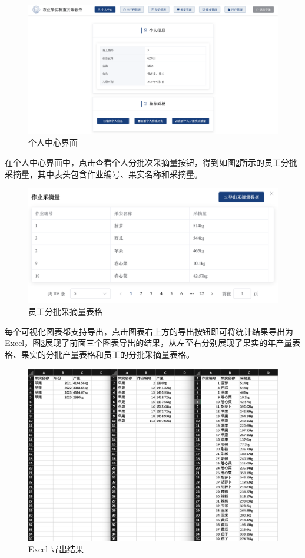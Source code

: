 \begin{figure}
    \centering
    \includegraphics[width=0.9\linewidth]{../result/web-me.png}
    \caption{个人中心界面}
    \label{fig:web-me}
\end{figure}

在个人中心界面中，点击查看个人分批次采摘量按钮，得到如图\ref{fig:chart-user-works}所示的员工分批采摘量，其中表头包含作业编号、果实名称和采摘量。

\begin{figure}
    \centering
    \includegraphics[width=0.9\linewidth]{../result/chart-user-works.png}
    \caption{员工分批采摘量表格}
    \label{fig:chart-user-works}
\end{figure}

每个可视化图表都支持导出，点击图表右上方的导出按钮即可将统计结果导出为 Excel，图\ref{fig:chart-excels}展现了前面三个图表导出的结果，从左至右分别展现了果实的年产量表格、果实的分批产量表格和员工的分批采摘量表格。

\begin{figure}
    \centering
    \includegraphics[width=0.9\linewidth]{../result/chart-excels.png}
    \caption{Excel 导出结果}
    \label{fig:chart-excels}
\end{figure}


